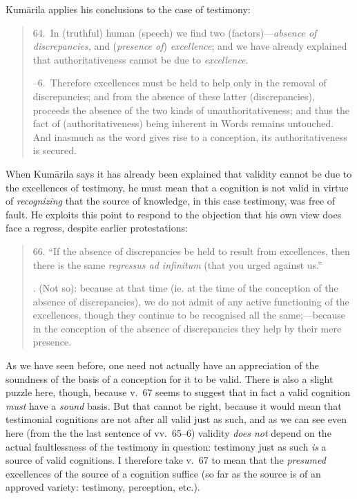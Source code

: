 ﻿\documentclass[11pt]{amsart}
\begin{document}
Kum\=arila applies his conclusions to the case of testimony:\small\begin{quote}64.~In (truthful) human (speech) we find two (factors)---\emph{absence of discrepancies,} and (\emph{presence of}) \emph{excellence}; and we have already explained that authoritativeness cannot be due to \emph{excellence}.

--6.~Therefore excellences must be held to help only in the removal of discrepancies; and from the absence of these latter (discrepancies), proceeds the absence of the two kinds of unauthoritativeness; and thus the fact of (authoritativeness) being inherent in Words remains untouched. And inasmuch as the word gives rise to a conception, its authoritativeness is secured.\end{quote}\normalsize When Kum\=arila says it has already been explained that validity cannot be due to the excellences of testimony, he must mean that a cognition is not valid in virtue of \emph{recognizing} that the source of knowledge, in this case testimony, was free of fault. He exploits this point to respond to the objection that his own view does face a regress, despite earlier protestations:\small\begin{quote}66. ``If the absence of discrepancies be held to result from excellences, then there is the same \emph{regressus ad infinitum} (that you urged against us.''

. (Not so): because at that time (ie. at the time of the conception of the absence of discrepancies), we do not admit of any active functioning of the excellences, though they continue to be recognised all the same;---because in the conception of the absence of discrepancies they help by their mere presence.\end{quote}\normalsize As we have seen before, one need not actually have an appreciation of the soundness of the basis of a conception for it to be valid. There is also a slight puzzle here, though, because v.~67 seems to suggest that in fact a valid cognition \emph{must} have a \emph{sound} basis. But that cannot be right, because it would mean that testimonial cognitions are not after all valid just as such, and as we can see even here (from the the last sentence of vv.~65--6) validity \emph{does not} depend on the actual faultlessness of the testimony in question: testimony just as such \emph{is} a source of valid cognitions. I therefore take v.~67 to mean that the \emph{presumed} excellences of the source of a cognition suffice (so far as the source is of an approved variety: testimony, perception, etc.).
\end{document}
